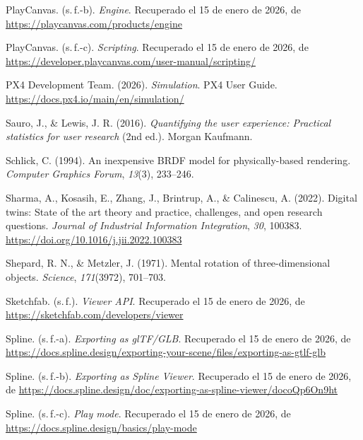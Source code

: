 \begin{list}{}
\item PlayCanvas. (s.\,f.-b). \textit{Engine}. Recuperado el 15 de enero de 2026, de \url{https://playcanvas.com/products/engine}

\item PlayCanvas. (s.\,f.-c). \textit{Scripting}. Recuperado el 15 de enero de 2026, de \url{https://developer.playcanvas.com/user-manual/scripting/}

\item PX4 Development Team. (2026). \textit{Simulation}. PX4 User Guide. \url{https://docs.px4.io/main/en/simulation/}

\item Sauro, J., \& Lewis, J. R. (2016). \textit{Quantifying the user experience: Practical statistics for user research} (2nd ed.). Morgan Kaufmann.

\item Schlick, C. (1994). An inexpensive BRDF model for physically-based rendering. \textit{Computer Graphics Forum}, \textit{13}(3), 233--246.

\item Sharma, A., Kosasih, E., Zhang, J., Brintrup, A., \& Calinescu, A. (2022). Digital twins: State of the art theory and practice, challenges, and open research questions. \textit{Journal of Industrial Information Integration}, \textit{30}, 100383. \url{https://doi.org/10.1016/j.jii.2022.100383}

\item Shepard, R. N., \& Metzler, J. (1971). Mental rotation of three-dimensional objects. \textit{Science}, \textit{171}(3972), 701--703.

\item Sketchfab. (s.\,f.). \textit{Viewer API}. Recuperado el 15 de enero de 2026, de \url{https://sketchfab.com/developers/viewer}

\item Spline. (s.\,f.-a). \textit{Exporting as glTF/GLB}. Recuperado el 15 de enero de 2026, de \url{https://docs.spline.design/exporting-your-scene/files/exporting-as-gtlf-glb}

\item Spline. (s.\,f.-b). \textit{Exporting as Spline Viewer}. Recuperado el 15 de enero de 2026, de \url{https://docs.spline.design/doc/exporting-as-spline-viewer/docoQp6On9ht}

\item Spline. (s.\,f.-c). \textit{Play mode}. Recuperado el 15 de enero de 2026, de \url{https://docs.spline.design/basics/play-mode}


\end{list}
